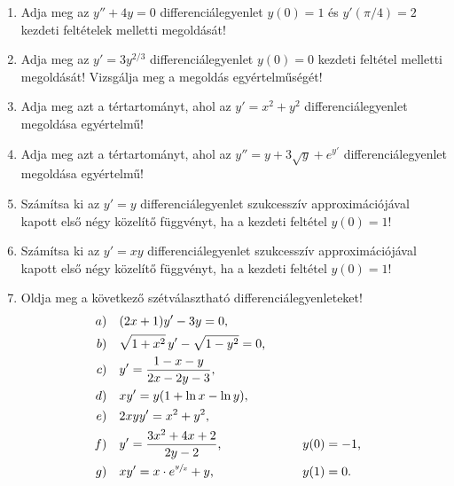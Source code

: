 \documentclass{szb-practice}
\begin{document}
\begin{enumerate}
  \item Adja meg az $y'' + 4y = 0$ differenciálegyenlet $y(0) = 1$ és
        $y'(\pi/4) = 2$ kezdeti feltételek melletti megoldását!

  \item Adja meg az $y' = 3y^{2/3}$ differenciálegyenlet $y(0) = 0$ kezdeti
        feltétel melletti megoldását! Vizsgálja meg a megoldás egyértelműségét!

  \item Adja meg azt a tértartományt, ahol az $y' = x^2 + y^2$
        differenciálegyenlet megoldása egyértelmű!

  \item Adja meg azt a tértartományt, ahol az $y'' = y + 3 \sqrt{y} + e^{y'}$
        differenciálegyenlet megoldása egyértelmű!

  \item Számítsa ki az $y' = y$ differenciálegyenlet szukcesszív
        approximációjával kapott első négy közelítő függvényt, ha a kezdeti
        feltétel $y(0) = 1$!

  \item Számítsa ki az $y' = xy$ differenciálegyenlet szukcesszív
        approximációjával kapott első négy közelítő függvényt, ha a kezdeti
        feltétel $y(0) = 1$!

  \item Oldja meg a következő szétválasztható differenciálegyenleteket!
        \begin{alignat*}{9}
          a & ) \quad (2x + 1) y' - 3y = 0
          \text,                                                            \\
          b & ) \quad \sqrt{1 + x^2} \, y' - \sqrt{1 - y^2} = 0
          \text,                                                            \\
          c & ) \quad y' = \frac{1 - x - y}{2x - 2y - 3}
          \text,                                                            \\
          d & ) \quad xy' = y(1 + \ln x - \ln y)
          \text,                                                            \\
          e & ) \quad 2xyy' = x^2 + y^2
          \text,                                                            \\
          f & ) \quad y' = \frac{3x^2 + 4x + 2}{2y - 2}
          \text,
            & \qquad                                            & y(0) = -1
          \text,                                                            \\
          g & ) \quad xy' = x \cdot e^{\sfrac{y}{x}} + y
          \text,
            & \qquad                                            & y(1) = 0
          \text.
        \end{alignat*}


\end{enumerate}
\end{document}
